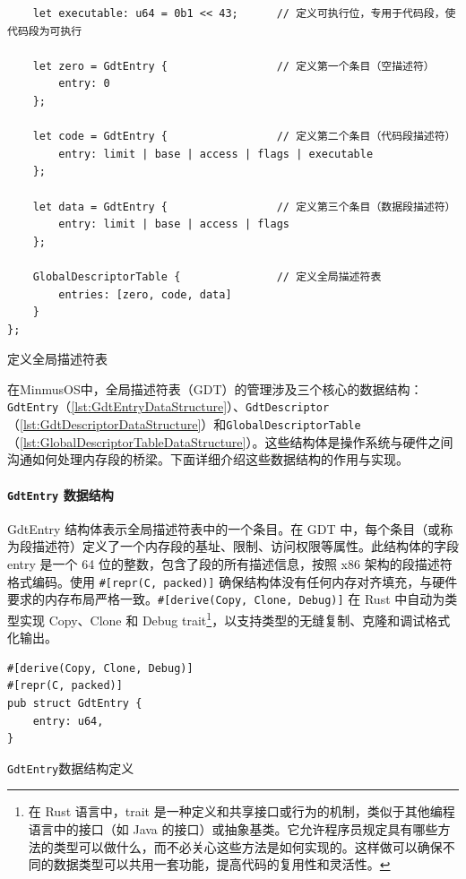 \begin{listing}[htbp]
\begin{verbatim}
    let executable: u64 = 0b1 << 43;      // 定义可执行位，专用于代码段，使代码段为可执行

    let zero = GdtEntry {                 // 定义第一个条目（空描述符）
        entry: 0
    };

    let code = GdtEntry {                 // 定义第二个条目（代码段描述符）
        entry: limit | base | access | flags | executable
    };

    let data = GdtEntry {                 // 定义第三个条目（数据段描述符）
        entry: limit | base | access | flags
    };

    GlobalDescriptorTable {               // 定义全局描述符表
        entries: [zero, code, data]
    }
};
    \end{verbatim}
    \caption{定义全局描述符表}\label{lst:GlobalDescriptorTable}
\end{listing}

在MinmusOS中，全局描述符表（GDT）的管理涉及三个核心的数据结构：\texttt{GdtEntry}（\cref{lst:GdtEntryDataStructure}）、\texttt{GdtDescriptor}（\cref{lst:GdtDescriptorDataStructure}）和\texttt{GlobalDescriptorTable}（\cref{lst:GlobalDescriptorTableDataStructure}）。这些结构体是操作系统与硬件之间沟通如何处理内存段的桥梁。下面详细介绍这些数据结构的作用与实现。

\paragraph{\texttt{GdtEntry} 数据结构}

GdtEntry 结构体表示全局描述符表中的一个条目。在 GDT 中，每个条目（或称为段描述符）定义了一个内存段的基址、限制、访问权限等属性。此结构体的字段 entry 是一个 64 位的整数，包含了段的所有描述信息，按照 x86 架构的段描述符格式编码。使用 \texttt{\#[repr(C, packed)]} 确保结构体没有任何内存对齐填充，与硬件要求的内存布局严格一致。\texttt{\#[derive(Copy, Clone, Debug)]} 在 Rust 中自动为类型实现 Copy、Clone 和 Debug trait\footnote{在 Rust 语言中，trait 是一种定义和共享接口或行为的机制，类似于其他编程语言中的接口（如 Java 的接口）或抽象基类。它允许程序员规定具有哪些方法的类型可以做什么，而不必关心这些方法是如何实现的。这样做可以确保不同的数据类型可以共用一套功能，提高代码的复用性和灵活性。}，以支持类型的无缝复制、克隆和调试格式化输出。

\begin{listing}[htbp]
    \begin{verbatim}
#[derive(Copy, Clone, Debug)]
#[repr(C, packed)]
pub struct GdtEntry {
    entry: u64,
}
    \end{verbatim}
    \caption{\texttt{GdtEntry}数据结构定义}\label{lst:GdtEntryDataStructure}
\end{listing}

